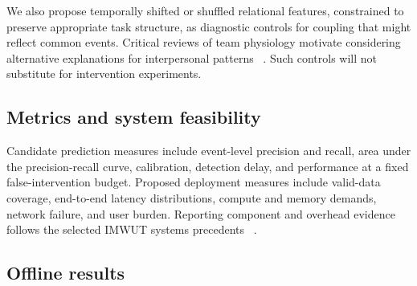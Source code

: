 We also propose temporally shifted or shuffled relational features, constrained to preserve appropriate task structure, as diagnostic controls for coupling that might reflect common events. Critical reviews of team physiology motivate considering alternative explanations for interpersonal patterns ~\cite{p32,p49}. Such controls will not substitute for intervention experiments.


\subsection{Metrics and system feasibility}

Candidate prediction measures include event-level precision and recall, area under the precision-recall curve, calibration, detection delay, and performance at a fixed false-intervention budget. Proposed deployment measures include valid-data coverage, end-to-end latency distributions, compute and memory demands, network failure, and user burden. Reporting component and overhead evidence follows the selected IMWUT systems precedents ~\cite{pro2,deep,hhiss}.


\subsection{Offline results}

